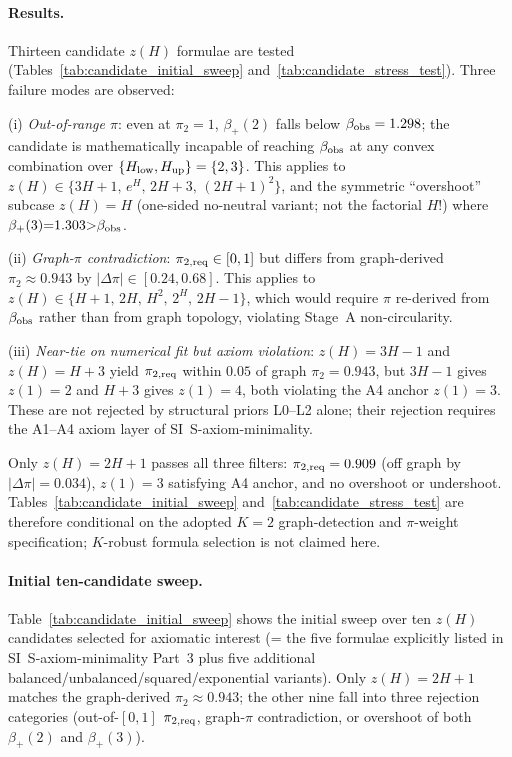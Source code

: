 \paragraph{Results.}
Thirteen candidate \(z(H)\) formulae are tested (Tables~\ref{tab:candidate_initial_sweep} and~\ref{tab:candidate_stress_test}). Three failure modes are observed:

(i) \emph{Out-of-range \(\pi\)}: even at \(\pi_2{=}1\), \(\beta_+(2)\) falls below \(\beta_{\rm obs}=1.298\); the candidate is mathematically incapable of reaching \(\beta_{\rm obs}\) at any convex combination over \(\{H_{\rm low},H_{\rm up}\}=\{2,3\}\). This applies to \(z(H)\in\{3H{+}1,\,e^H,\,2H{+}3,\,(2H{+}1)^2\}\), and the symmetric ``overshoot'' subcase \(z(H){=}H\) (one-sided no-neutral variant; not the factorial \(H!\)) where \(\beta_+(3){=}1.303{>}\beta_{\rm obs}\).

(ii) \emph{Graph-\(\pi\) contradiction}: \(\pi_{2,\rm req}\in[0,1]\) but differs from graph-derived \(\pi_2{\approx}0.943\) by \(|\Delta\pi|\in[0.24,0.68]\). This applies to \(z(H)\in\{H{+}1,\,2H,\,H^2,\,2^H,\,2H{-}1\}\), which would require \(\pi\) re-derived from \(\beta_{\rm obs}\) rather than from graph topology, violating Stage~A non-circularity.

(iii) \emph{Near-tie on numerical fit but axiom violation}: \(z(H){=}3H{-}1\) and \(z(H){=}H{+}3\) yield \(\pi_{2,\rm req}\) within \(0.05\) of graph \(\pi_2{=}0.943\), but \(3H{-}1\) gives \(z(1){=}2\) and \(H{+}3\) gives \(z(1){=}4\), both violating the A4 anchor \(z(1){=}3\). These are not rejected by structural priors L0--L2 alone; their rejection requires the A1--A4 axiom layer of SI~\textsf{S-axiom-minimality}.

Only \(z(H){=}2H{+}1\) passes all three filters: \(\pi_{2,\rm req}=0.909\) (off graph by \(|\Delta\pi|=0.034\)), \(z(1){=}3\) satisfying A4 anchor, and no overshoot or undershoot. Tables~\ref{tab:candidate_initial_sweep} and~\ref{tab:candidate_stress_test} are therefore conditional on the adopted \(K{=}2\) graph-detection and \(\pi\)-weight specification; \(K\)-robust formula selection is not claimed here.

\paragraph{Initial ten-candidate sweep.}
Table~\ref{tab:candidate_initial_sweep} shows the initial sweep over ten \(z(H)\) candidates selected for axiomatic interest (= the five formulae explicitly listed in SI~\textsf{S-axiom-minimality} Part~3 plus five additional balanced/unbalanced/squared/exponential variants). Only \(z(H){=}2H{+}1\) matches the graph-derived \(\pi_2{\approx}0.943\); the other nine fall into three rejection categories (out-of-\([0,1]\) \(\pi_{2,\rm req}\), graph-\(\pi\) contradiction, or overshoot of both \(\beta_+(2)\) and \(\beta_+(3)\)).

